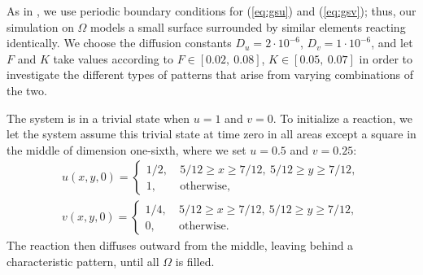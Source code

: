 \documentclass[a4paper,11pt]{article}
\newcommand{\ban}[1]{\begin{align}    #1    \end{align}}
\begin{document}
As in \cite{Wang}, we use periodic boundary conditions for (\ref{eq:gsu}) and (\ref{eq:gsv}); thus, our simulation on $\Omega$ models a small surface surrounded by similar elements reacting identically. We choose the diffusion constants $D_u = 2 \cdot 10^{-6}$, $D_v = 1 \cdot 10^{-6}$, and let $F$ and $K$ take values according to $F \in [0.02, \ 0.08]$, $K \in [0.05,\ 0.07]$ in order to investigate the different types of patterns that arise from varying combinations of the two.

The system is in a trivial state when $u = 1$ and $v=0$.  To initialize a reaction, we let the system assume this trivial state at time zero in all areas except a square in the middle of dimension one-sixth, where we set $u = 0.5$ and $v = 0.25$:
\ban{
\label{eq:icu}
u(x,y,0) = \begin{cases}
1/2, & \ 5/12 \ge x \ge 7/12, \ 5/12 \ge y \ge 7/12,\\
1, & \ \text{otherwise},
 \end{cases}\\
 \label{eq:icv}
 v(x,y,0) = \begin{cases}
1/4, & \ 5/12 \ge x \ge 7/12, \ 5/12 \ge y \ge 7/12,\\
0, & \ \text{otherwise}.
 \end{cases}
}
The reaction then diffuses outward from the middle, leaving behind a characteristic pattern, until all $\Omega$ is filled.
\end{document}
